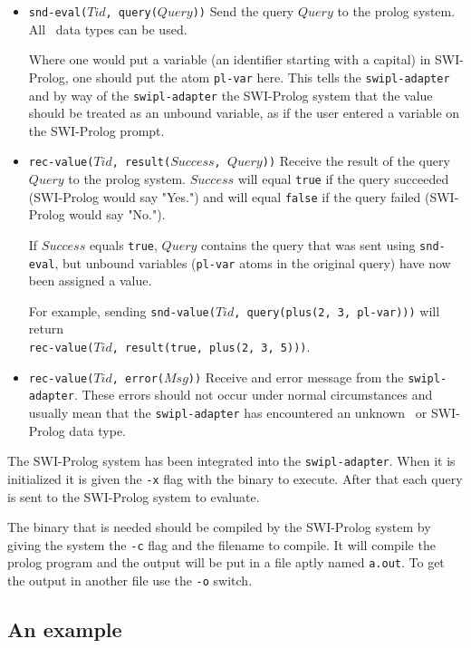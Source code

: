 \begin{itemize}
\item {\tt snd-eval($Tid$, query($Query$))} Send the query $Query$ to the
prolog system. All \TB\ data types can be used.

Where one would put a variable (an identifier starting with a capital) in
SWI-Prolog, one should put the atom {\tt pl-var} here.
This tells the {\tt swipl-adapter} and by way of the {\tt swipl-adapter}
the SWI-Prolog system that the value should be treated as an unbound variable,
as if the user entered a variable on the SWI-Prolog prompt.

\item {\tt rec-value($Tid$, result($Success$, $Query$))} Receive the result of
the query $Query$ to the prolog system. $Success$ will equal {\tt true} if the
query succeeded (SWI-Prolog would say "Yes.") and will equal
{\tt false} if the query failed (SWI-Prolog would say "No.").

If $Success$ equals {\tt true}, $Query$ contains the query that was sent using
{\tt snd-eval}, but unbound variables ({\tt pl-var} atoms in the original
query) have now been assigned a value.

For example, sending {\tt snd-value($Tid$, query(plus(2, 3, pl-var)))}
will return\\
{\tt rec-value($Tid$, result(true, plus(2, 3, 5)))}.

\item {\tt rec-value($Tid$, error($Msg$))} Receive and error message from
the {\tt swipl-adapter}. These errors should not occur under normal
circumstances and usually mean that the {\tt swipl-adapter} has encountered
an unknown \TB\ or SWI-Prolog data type.
\end{itemize}

The SWI-Prolog system has been integrated into the {\tt swipl-adapter}. When
it is initialized it is given the {\tt -x} flag with the binary to execute.
After that each query is sent to the SWI-Prolog system to evaluate.

The binary that is needed should be compiled by the SWI-Prolog system by
giving the system the {\tt -c} flag and the filename to compile. It will compile
the prolog program and the output will be put in a file aptly named
{\tt a.out}. To get the output in another file use the {\tt -o} switch.

\subsection{An example}

